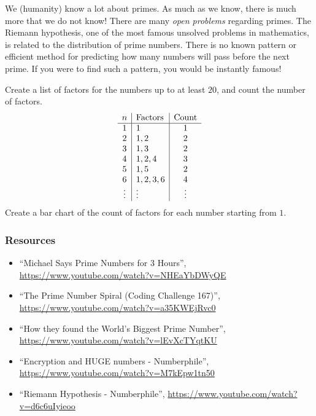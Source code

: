 We (humanity) know a lot about primes. 
As much as we know, there is much more that we do not know!  There are many \emph{open problems} regarding primes.  The Riemann hypothesis, one of the most famous unsolved problems in mathematics, is related to the distribution of prime numbers.  There is no known pattern or efficient method for predicting how many numbers will pass before the next prime.  If you were to find such a pattern, you would be instantly famous!  

\begin{exercise}
Create a list of factors for the numbers up to at least \(20\), and count the number of factors.  
\[ 
	\begin{array}{c | l | c}
		n & \text{Factors} & \text{Count} \\ \hline 		 
		1 & 1  & 1\\ 
		2 & 1, 2 & 2\\ 
		3 & 1, 3 & 2\\ 
		4 & 1, 2, 4 & 3\\
		5 & 1, 5 & 2 \\
		6 & 1, 2, 3, 6 & 4 \\ 
		\vdots & \vdots & \vdots  \\
	\end{array}
\]
Create a bar chart of the count of factors for each number starting from \(1\).  
\end{exercise}

\subsubsection{Resources}
\begin{itemize}
	\item {\footnotesize ``Michael Says Prime Numbers for 3 Hours'', \url{https://www.youtube.com/watch?v=NHEaYbDWyQE}}
	\item {\footnotesize ``The Prime Number Spiral (Coding Challenge 167)'', \url{https://www.youtube.com/watch?v=a35KWEjRvc0}}
	\item {\footnotesize ``How they found the World's Biggest Prime Number'', \url{https://www.youtube.com/watch?v=lEvXcTYqtKU}}
	\item {\footnotesize ``Encryption and HUGE numbers - Numberphile'', \url{https://www.youtube.com/watch?v=M7kEpw1tn50}}
	\item {\footnotesize ``Riemann Hypothesis - Numberphile'', \url{https://www.youtube.com/watch?v=d6c6uIyieoo}}
\end{itemize}


